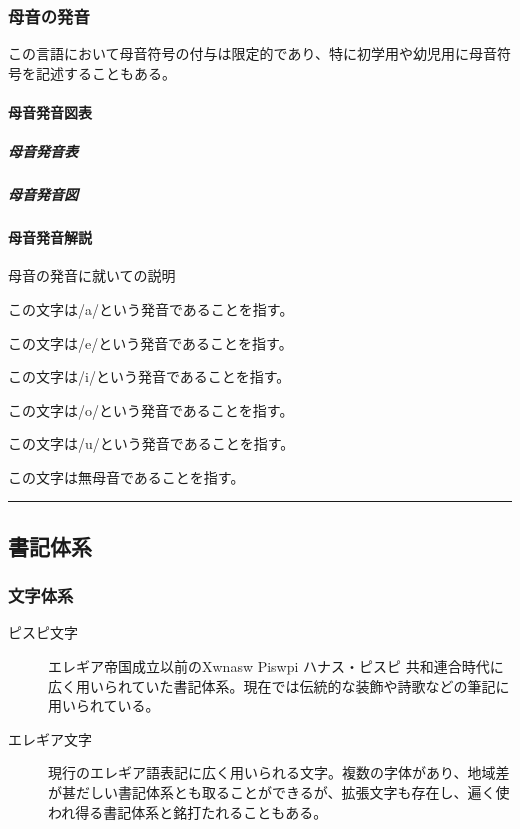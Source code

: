 \documentclass[
  japanese,
]{article}
\providecommand{\tightlist}{%
  \setlength{\itemsep}{0pt}\setlength{\parskip}{0pt}}
\begin{document}
\subsubsection{母音の発音}\label{section2.2}

この言語において母音符号の付与は限定的であり、特に初学用や幼児用に母音符号を記述することもある。

\paragraph{母音発音図表}\label{subsection2.2.1}

\subparagraph{母音発音表}\label{subsubsection2.2.1.1}

\subparagraph{母音発音図}\label{subsubsection2.2.1.2}

\paragraph{母音発音解説}\label{subsection2.2.2}

母音の発音に就いての説明

\begin{description}
\tightlist
\item[{◌a}]
この文字は{/a/}という発音であることを指す。
\item[{◌e}]
この文字は{/e/}という発音であることを指す。
\item[{◌i}]
この文字は{/i/}という発音であることを指す。
\item[{◌o}]
この文字は{/o/}という発音であることを指す。
\item[{◌u}]
この文字は{/u/}という発音であることを指す。
\item[{◌w}]
この文字は無母音であることを指す。
\end{description}

\begin{center}\rule{0.5\linewidth}{0.5pt}\end{center}

\subsection{書記体系}\label{chapter3}

\subsubsection{文字体系}\label{section3.1}

\begin{description}
\item[ピスピ文字]
エレギア帝国成立以前の{Xwnasw Piswpi} ハナス・ピスピ
共和連合時代に広く用いられていた書記体系。現在では伝統的な装飾や詩歌などの筆記に用いられている。
\item[エレギア文字]
現行のエレギア語表記に広く用いられる文字。複数の字体があり、地域差が甚だしい書記体系とも取ることができるが、拡張文字も存在し、遍く使われ得る書記体系と銘打たれることもある。
\end{description}
\end{document}
